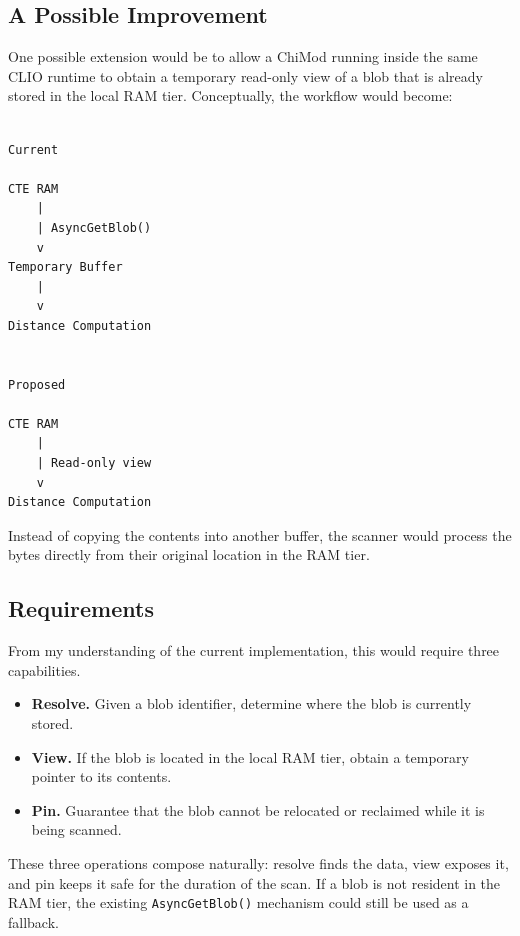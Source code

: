 \documentclass[11pt]{article}
\begin{document}
\subsection{A Possible Improvement}

One possible extension would be to allow a ChiMod running inside the
same CLIO runtime to obtain a temporary read-only view of a blob that
is already stored in the local RAM tier. Conceptually, the workflow
would become:

\begin{verbatim}

Current

CTE RAM
    |
    | AsyncGetBlob()
    v
Temporary Buffer
    |
    v
Distance Computation


Proposed

CTE RAM
    |
    | Read-only view
    v
Distance Computation

\end{verbatim}

Instead of copying the contents into another buffer, the scanner would
process the bytes directly from their original location in the RAM
tier.

\subsection{Requirements}

From my understanding of the current implementation, this would
require three capabilities.

\begin{itemize}

\item \textbf{Resolve.} Given a blob identifier, determine where the
blob is currently stored.

\item \textbf{View.} If the blob is located in the local RAM tier,
obtain a temporary pointer to its contents.

\item \textbf{Pin.} Guarantee that the blob cannot be relocated or
reclaimed while it is being scanned.

\end{itemize}

These three operations compose naturally: resolve finds the data, view
exposes it, and pin keeps it safe for the duration of the scan. If a
blob is not resident in the RAM tier, the existing
\texttt{AsyncGetBlob()} mechanism could still be used as a fallback.
\end{document}
